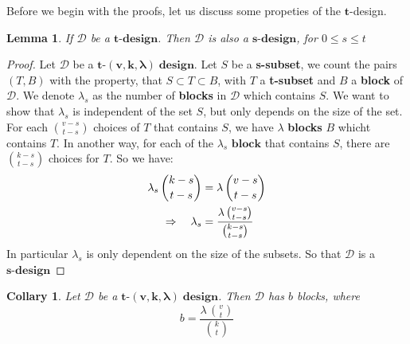\documentclass{article}
\newtheorem{lemma}[theorem]{Lemma}
\newtheorem{collary}[theorem]{Collary}
\numberwithin{equation}{theorem}
\numberwithin{figure}{theorem}
\newcommand{\tCompleteDesign}{\ensuremath{\bm{t\mbox{-}(v,k,\lambda)\; design}}}
\newcommand{\myBlock}{\textbf{block}}
\newcommand{\pluralMyBlock}{\textbf{blocks}}
\newcommand{\xDesign}[1]{\ensuremath{\bm{#1\mbox{-}design}}}
\newcommand{\dDes}{\ensuremath{\mathscr{D}}}
\begin{document}
Before we begin with the proofs, let us discuss some propeties of the $\bm{t}$-design.
\begin{lemma}\label{propTdesign}
If $\mathscr{D}$ be a $\bm{t\mbox{-}design}$. Then $\mathscr{D}$ is also a $\bm{s\mbox{-}design}$, for $0 \leq s \leq t$
\end{lemma}
\begin{proof}
Let $\mathscr{D}$ be a \tCompleteDesign.
Let $S$ be a \textbf{s-subset}, we count the pairs $(T,B)$ with the property, that $S \subset T \subset B$, with $T$ a \textbf{t-subset} and $B$ a \textbf{block} of $\mathscr{D}$. We denote $\lambda_s$ as the number of \textbf{blocks} in $\mathscr{D}$ which contains $S$. We want to show that $\lambda_s$ is independent of the set $S$, but only depends on the size of the set. 
For each $\binom{v-s}{t-s}$ choices of $T$ that contains $S$, we have $\lambda$ {\pluralMyBlock} $B$ whicht contains $T$. In another way, for each of the $\lambda_s$ $\myBlock$ that contains $S$, there are $\binom{k-s}{t-s}$ choices for $T$. So we have:
\begin{align}
	\lambda_s \, \binom{k-s}{t-s} &= \lambda \, \binom{v-s}{t-s} \notag\\
	\Rightarrow  \quad \lambda_s &= \frac{\lambda \, \binom{v-s}{t-s}}{\binom{k-s}{t-s}} \label{sDesign}
\end{align}
In particular $\lambda_s$ is only dependent on the size of the subsets. So that $\mathscr{D}$ is a \xDesign{s}
\end{proof}

\begin{collary}\label{blockCount}
Let {\dDes} be a \tCompleteDesign.
Then {\dDes} has $b$ blocks, where
\[
	b = \frac{\lambda \, \binom{v}{t}}{\binom{k}{t}}
\]
\end{collary}
\end{document}
